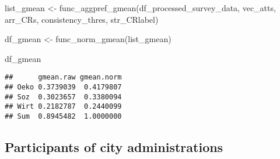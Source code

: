 \documentclass[
]{article}
\newenvironment{Shaded}{\begin{snugshade}}{\end{snugshade}}
\newcommand{\FunctionTok}[1]{\textcolor[rgb]{0.39,0.29,0.61}{#1}}
\newcommand{\NormalTok}[1]{\textcolor[rgb]{0.12,0.11,0.11}{#1}}
\newcommand{\OtherTok}[1]{\textcolor[rgb]{0.00,0.43,0.16}{#1}}
\begin{document}
\begin{Shaded}
\begin{Highlighting}[]
\NormalTok{list\_gmean }\OtherTok{\textless{}{-}} \FunctionTok{func\_aggpref\_gmean}\NormalTok{(df\_processed\_survey\_data, vec\_atts, arr\_CRs, consistency\_thres, str\_CRlabel)}

\NormalTok{df\_gmean }\OtherTok{\textless{}{-}} \FunctionTok{func\_norm\_gmean}\NormalTok{(list\_gmean)}

\NormalTok{df\_gmean}
\end{Highlighting}
\end{Shaded}

\begin{verbatim}
##      gmean.raw gmean.norm
## Oeko 0.3739039  0.4179807
## Soz  0.3023657  0.3380094
## Wirt 0.2182787  0.2440099
## Sum  0.8945482  1.0000000
\end{verbatim}

\hypertarget{participants-of-city-administrations}{%
\subsection{Participants of city
administrations}\label{participants-of-city-administrations}}
\end{document}
